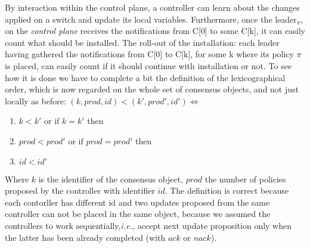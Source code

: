 \documentclass{article}
\theoremstyle{remark}
\begin{document}
 By interaction within the control plane, a controller can learn about the changes applied on a switch and update its local variables. Furthermore, once the leader$_\pi$, on the \emph{control plane} receives the notifications from C[0] to some C[k], it can easily count what should be installed.%
  The roll-out of the installation: each leader having gathered the notifications from C[0] to C[k], for some k where its policy $\pi$ is placed, can easily count if it should continue with installation or not.
To see how it is done we have to complete a bit the definition of the lexicographical order, which is now regarded on the whole set of consensus objects, and not just locally as before:
$(k,prod,id)<(k',prod',id') \Leftrightarrow $
\begin{enumerate}
\item $k<k'$ or if $k=k'$ then 
\item $prod<prod'$ or if $prod=prod'$ then
\item $id<id'$
\end{enumerate}
Where $k$ is the identifier of the consensus object, $prod$ the number of policies proposed by the controller with identifier $id$. The definition is correct because each contorller has different id and two updates proposed from the same controller can not be placed in the same object, because we assumed the controllers to work sequentially,\emph{i.e.,} accept next update proposition only when the latter has been already completed (with $ack$ or $nack$).
%
\end{document}

